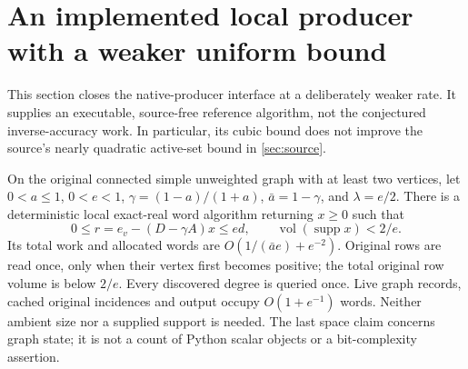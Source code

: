 \section{An implemented local producer with a weaker uniform bound}
\label{sec:op3-native-gap-push}

This section closes the native-producer interface at a deliberately weaker
rate. It supplies an executable, source-free reference algorithm, not the
conjectured inverse-accuracy work. In particular, its cubic bound does not
improve the source's nearly quadratic active-set bound in \cref{sec:source}.

\begin{theorem}
\label{thm:op3-native-gap-push}
On the original connected simple unweighted graph with at least two
vertices, let $0<a\leq1$, $0<e<1$, $\gamma=(1-a)/(1+a)$,
$\bar a=1-\gamma$, and $\lambda=e/2$. There is a deterministic local
exact-real word algorithm returning $x\geq0$ such that
\[
 0\leq r=e_v-(D-\gamma A)x\leq e d,
 \qquad \operatorname{vol}(\operatorname{supp}x)<2/e.
\]
Its total work and allocated words are
$O(1/(\bar a e)+e^{-2})$. Original rows are read once, only when their
vertex first becomes positive; the total original row volume is below
$2/e$. Every discovered degree is queried once. Live graph records,
cached original incidences and output occupy $O(1+e^{-1})$ words.
Neither ambient size nor a supplied support is needed. The last space
claim concerns graph state; it is not a count of Python scalar objects or
a bit-complexity assertion.
\end{theorem}
